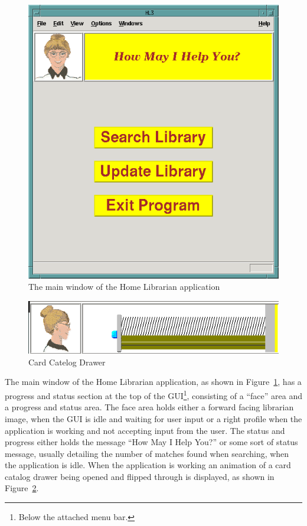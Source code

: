\begin{figure}[hpt]
\begin{centering}
\includegraphics[width=5in]{MainWindow.png}
\caption{The main window of the Home Librarian application}
\label{fig:ref:MainWindow}
\end{centering}
\end{figure}
\begin{figure}[hpt]
\begin{centering}
\includegraphics[width=5in]{CardCatDrawer.png}
\caption{Card Catelog Drawer}
\label{fig:ref:headerAnimation}
\end{centering}
\end{figure}
The main window of the Home Librarian application, as shown in
Figure~\ref{fig:ref:MainWindow}, has a progress and status section at
the top of the GUI\footnote{Below the attached menu bar.}, consisting
of a ``face'' area and a progress and status area. The face area holds
either a forward facing librarian image, when the GUI is idle and
waiting for user input or a right profile when the application is
working and not accepting input from the user. The status and progress
either holds the message ``How May I Help You?'' or some sort of status
message, usually detailing the number of matches found when searching,
when the application is idle. When the application is working an
animation of a card catalog drawer being opened and flipped through is
displayed, as shown in Figure~\ref{fig:ref:headerAnimation}.






